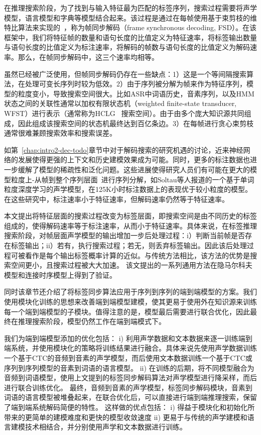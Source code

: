 在推理搜索阶段，为了找到与输入特征最为匹配的标签序列，搜索过程需要将声学模型，语言模型和字典等模型结合起来。该过程是通过在每帧使用基于束剪枝的维特比算法来实现的~\cite{forney1973viterbi}，称为帧同步解码（frame synchronous decoding, FSD）。在该框架中，我们将特征帧的数量和语句长度的比值定义为特征速率，将标签输出数量与语句长度的比值定义为标注速率，将解码的帧数与语句长度的比值定义为解码速率。那么，在帧同步解码中，这三个速率均相等。

虽然已经被广泛使用，但帧同步解码仍存在一些缺点：1）这是一个等间隔搜索算法，在处理可变长序列时较为低效。2）由于序列被分解为帧来作为特征序列，模型的粒度变小，导致搜索空间很大。比如ASR中词语历史，音素序列，以及HMM状态之间的关联性通常以加权有限状态机（weighted finite-state transducer, WFST）进行表示（通常称为HCLG~\cite{mohri2002weighted} 搜索空间）。由于由多个庞大知识源共同组成，因此组成该搜索空间的状态机最终达到百亿条边。3）在每帧进行贪心束剪枝通常很难兼顾搜索效率和搜索误差。

如第~\ref{chap:intro2-dec-todo}章节中对于解码搜索的研究机遇的讨论，近来神经网络的发展使得更强的上下文和历史建模效果成为可能\cite{sak2014long,qian2016very}。同时，更多的标注数据也进一步缓解了模型的稀疏性和泛化问题。这些进展使得研究人员们有可能在更大的模型粒度上-从帧到整个序列层面~\cite{amodei2015deep,soltau2016neural,collobert2016wav2letter,sak2015fast,chan2016end}进行序列分解，如Soltau等人报道的一个基于单词粒度深度学习的声学模型\cite{soltau2016neural}，在125K小时标注数据上的表现优于较小粒度的模型。在这些研究中，标注速率小于特征速率，但解码速率仍然等于特征速率。

本文提出将特征层面的搜索过程改变为标签层面，即搜索空间是由不同历史的标签组成的，使得解码速率等于标注速率，从而小于特征速率。具体来说，在标签推理搜索阶段，对帧层面声学模型的输出增加一步后处理过程：i）判断当前帧是否存在标签输出；ii）若有，执行搜索过程；若无，则丢弃标签输出。因此该后处理过程可被看作是每个输出标签概率计算的近似。与传统方法相比，该方法的优势是搜索空间更小，且搜索过程被大大加速。
该文提出的一系列通用方法在隐马尔科夫模型和连接时序模型上得到了验证。

同时该章节还介绍了将标签同步算法应用于序列到序列的端到端模型的方案。我们使用模块化训练的思想来改善端到端模型建模，使其更易于使用外在知识源来训练每一个端到端模型的子模块。值得注意的是，模型最后需要进行联合优化，因此最终在推理搜索阶段，模型仍然工作在端到端模式下。

我们为端到端模型添加的优化包括：
i) 利用声学数据和文本数据来逐一训练端到端系统，并使用模块化的策略将训练结果进行融合。具体来说先使用声学数据训练一个基于CTC的音频到音素的声学模型，而后使用文本数据训练一个基于CTC或序列到序列模型的音素到词语的语言模型。
ii) 在训练的后期，将不同模型融合为音频到词语模型，使用上文提到的标签同步解码算法对声学模型进行降采样，而后进行联合训练优化。
最终，音频到音素的声学模型，标签同步解码模块，音素到词语的语言模型被堆叠起来，在联合优化后，可以直接进行端到端推理搜索，保留了端到端系统解码简便的特性。
%
这样做的优点包括： i) 得益于模块化和初始化所带来的更简单的建模难度和更快的模型收敛速度 ii) 更易于与传统的声学建模和语言建模技术相结合，并分别使用声学和文本数据进行训练。


